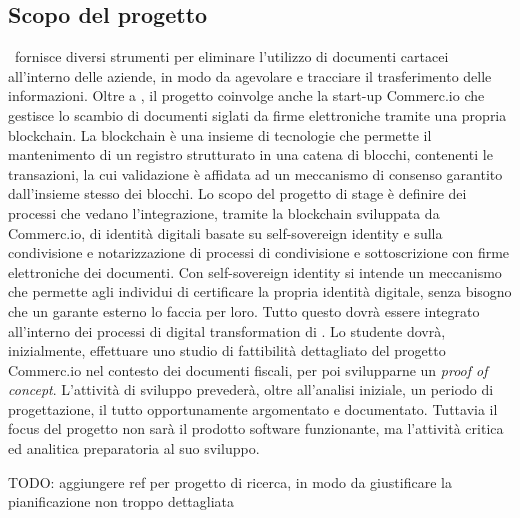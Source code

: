 
\subsection{Scopo del progetto}
	\ragioneSocAzienda\ fornisce diversi strumenti per eliminare l'utilizzo di documenti cartacei all’interno delle aziende, in modo da agevolare e tracciare il trasferimento delle informazioni. Oltre a \ragioneSocAzienda, il progetto coinvolge anche la start-up Commerc.io che gestisce lo scambio di documenti siglati da firme elettroniche tramite una propria blockchain.
	\newline
	La blockchain è una insieme di tecnologie che permette il mantenimento di un registro strutturato in una catena di blocchi, contenenti le transazioni, la cui validazione è affidata ad un meccanismo di consenso garantito dall'insieme stesso dei blocchi.
	\newline
	Lo scopo del progetto di stage è definire dei processi che vedano l'integrazione, tramite la blockchain sviluppata da Commerc.io, di identità digitali basate su self-sovereign identity e sulla condivisione e notarizzazione di processi di condivisione e sottoscrizione con firme elettroniche dei documenti.
	\newline
	Con self-sovereign identity si intende un meccanismo che permette agli individui di certificare la propria identità digitale, senza bisogno che un garante esterno lo faccia per loro.
	\newline
	Tutto questo dovrà essere integrato all'interno dei processi di digital transformation di \ragioneSocAzienda.
	\newline
	Lo studente dovrà, inizialmente, effettuare uno studio di fattibilità dettagliato del progetto Commerc.io nel contesto dei documenti fiscali, per poi svilupparne un \textit{proof of concept}. L'attività di sviluppo prevederà, oltre all'analisi iniziale, un periodo di progettazione, il tutto opportunamente argomentato e documentato.
	\newline
	Tuttavia il focus del progetto non sarà il prodotto software funzionante, ma l'attività critica ed analitica preparatoria al suo sviluppo.
	
	TODO: aggiungere ref per progetto di ricerca, in modo da giustificare la pianificazione non troppo dettagliata
